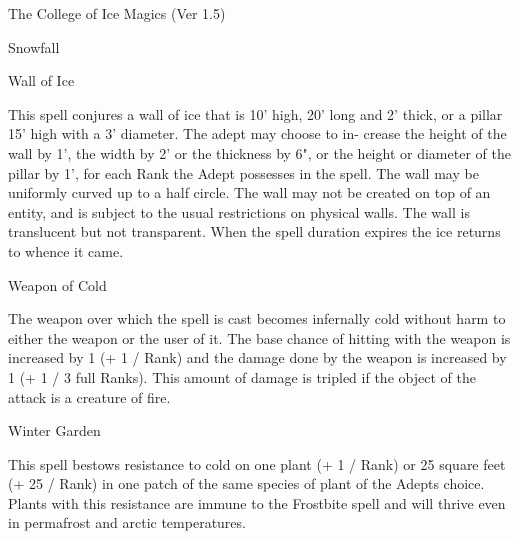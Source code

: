 \begin{Chapter}{The College of Ice Magics (Ver 1.5)}
\begin{spell}[S-14]{Snowfall }
\begin{effects}
\end{effects}
\end{spell}

\begin{spell}[S-15]{Wall of Ice }

\begin{effects}
This spell conjures a wall of ice that is 10’ 
high,  20’  long  and  2’  thick,  or  a  pillar  15’  high 
with  a  3’  diameter.  The  adept  may  choose  to  in-
crease the height of the wall by 1’, the width by 2’ 
or the thickness by 6", or the height or diameter of 
the pillar by 1’, for each Rank the Adept possesses 
in the spell. The wall may be uniformly curved up 
to a half circle. The wall may not be created on top 
of an entity, and is subject to the usual restrictions 
on  physical  walls.  The  wall  is  translucent  but  not 
transparent. When the spell duration expires the ice 
returns to whence it came. 

\end{effects}
\end{spell}

\begin{spell}[S-16]{Weapon of Cold }

\begin{effects}
 The  weapon  over  which  the  spell  is  cast 
becomes infernally cold without harm to either the 
weapon or the user of it. The base chance of hitting 
with the weapon is increased by 1 (+ 1 / Rank) and 
the  damage  done  by  the  weapon  is  increased  by  1 
(+  1  /  3  full  Ranks).  This  amount  of  damage  is 
tripled  if  the  object  of  the  attack  is  a  creature  of 
fire. 

\end{effects}
\end{spell}

\begin{spell}[S-17]{Winter Garden }

\begin{effects}
 This  spell  bestows  resistance  to  cold  on 
one  plant  (+  1  /  Rank)  or  25  square  feet  (+  25  / 
Rank) in one patch of the same species of plant of 
the  Adepts  choice.  Plants  with  this  resistance  are 
immune  to the  Frostbite  spell  and  will  thrive  even 
in permafrost and arctic temperatures. 



\end{effects}
\end{spell}
\end{Chapter}
